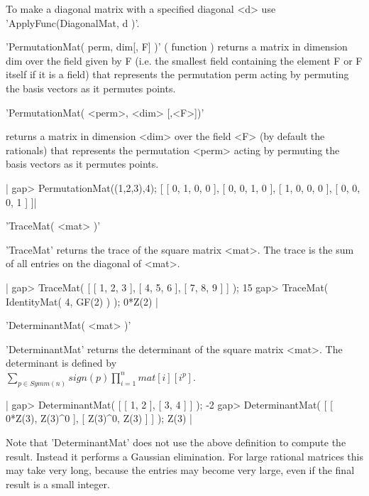 To make a diagonal matrix with a specified diagonal <d> use
'ApplyFunc(DiagonalMat, d )'.

'PermutationMat( perm, dim[, F] )'    ( function )
returns  a matrix  in dimension  dim over  the field  given by  F (i.e. the
smallest  field containing the element F or F itself if it is a field) that
represents the permutation perm acting by permuting the basis vectors as it
permutes points.

%

'PermutationMat( <perm>, <dim> [,<F>])'

returns  a matrix  in dimension  <dim> over  the field  <F> (by default the
rationals)  that represents the permutation  <perm> acting by permuting the
basis vectors as it permutes points.

|    gap> PermutationMat((1,2,3),4);
    [ [ 0, 1, 0, 0 ], [ 0, 0, 1, 0 ], [ 1, 0, 0, 0 ], [ 0, 0, 0, 1 ] ]|


'TraceMat( <mat> )'

'TraceMat' returns  the trace  of the square matrix <mat>.   The trace is
the sum of all entries on the diagonal of <mat>.

|    gap> TraceMat( [ [ 1, 2, 3 ], [ 4, 5, 6 ], [ 7, 8, 9 ] ] );
    15
    gap> TraceMat( IdentityMat( 4, GF(2) ) );
    0*Z(2) |


'DeterminantMat( <mat> )'

'DeterminantMat' returns the determinant of the square matrix <mat>.  The
determinant is defined by\\
$\sum_{p \in Symm(n)}{sign(p)\prod_{i=1}^{n}{mat[i][i^p]}}$.

|    gap> DeterminantMat( [ [ 1, 2 ], [ 3, 4 ] ] );
    -2
    gap> DeterminantMat( [ [ 0*Z(3), Z(3)^0 ], [ Z(3)^0, Z(3) ] ] );
    Z(3) |

Note that 'DeterminantMat' does not use  the above  definition to compute
the  result.   Instead  it  performs a Gaussian  elimination.   For large
rational matrices this may take very long, because the entries may become
very large, even if the final result is a small integer.


